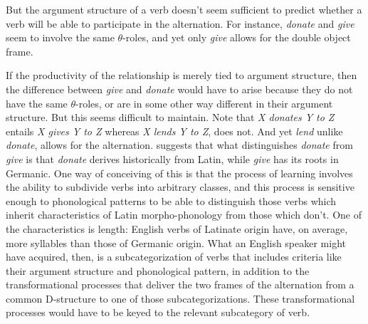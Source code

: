 But the argument structure of a verb doesn't seem sufficient to predict whether a verb will be able to participate in the alternation. For instance, \emph{donate} and \emph{give} seem to involve the same $\theta$-roles, and yet only \emph{give} allows for the double object frame.
\begin{exe}
	\raggedright
	\ex \label{ex5:donate} 
	\begin{xlist}
	\end{xlist}
\end{exe}
If the productivity of the relationship is merely tied to argument structure, then the difference between \emph{give} and \emph{donate} would have to arise because they do not have the same $\theta$-roles, or are in some other way different in their argument structure. But this seems difficult to maintain. Note that \emph{X donates Y to Z} entails \emph{X gives Y to Z} whereas \emph{X lends Y to Z}, does not. And yet \emph{lend} unlike \emph{donate}, allows for the alternation. \citet{Pinker:1989} suggests that what distinguishes \emph{donate} from \emph{give} is that \emph{donate} derives historically from Latin, while \emph{give} has its roots in Germanic. One way of conceiving of this is that the process of learning involves the ability to subdivide verbs into arbitrary classes, and this process is sensitive enough to phonological patterns to be able to distinguish those verbs which inherit characteristics of Latin morpho-phonology from those which don't.%
%
%
%
One of the characteristics is length: English verbs of Latinate origin have, on average, more syllables than those of Germanic origin. What an English speaker might have acquired, then, is a subcategorization of verbs that includes criteria like their argument structure and phonological pattern, in addition to the transformational processes that deliver the two frames of the alternation from a common D-structure to one of those subcategorizations. These transformational processes would have to be keyed to the relevant subcategory of verb. 

